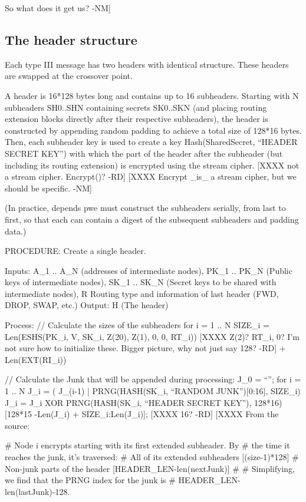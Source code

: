       So what does it get us?  -NM]  

\subsection{The header structure}

Each type III message has two headers with identical structure. These
headers are swapped at the crossover point.

A header is 16*128 bytes long and contains up to 16
subheaders. Starting with N subheaders SH0..SHN containing secrets
SK0..SKN (and placing routing extension blocks directly after their
respective subheaders), the header is constructed by appending 
random padding to achieve a total size
of 128*16 bytes. Then, each subheader key is used to create a key
Hash(SharedSecret, ``HEADER SECRET KEY'') with which the part of the
header after the subheader (but including its routing extension) is
encrypted using the stream cipher. 
[XXXX not a stream cipher. Encrypt()? -RD]
[XXXX Encrypt _is_ a stream cipher, but we should be specific. -NM]

(In practice, depends pwe must construct the subheaders serially, from last to
first, so that each can contain a digest of the subsequent subheaders
and padding data.) 

PROCEDURE: Create a single header.

Inputs: A_1 .. A_N (addresses of intermediate nodes), 
	PK_1 .. PK_N (Public keys of intermediate nodes),
	SK_1 .. SK_N (Secret keys to be shared with intermediate nodes),
        R Routing type and information of last header (FWD, DROP, SWAP, etc.)
Output: H (The header)

Process: 
  // Calculate the sizes of the subheaders
  for i = 1 .. N
	SIZE_i = Len(ESHS(PK_i, V, SK_i, Z(20), Z(1), 0, 0, RT_i))
[XXXX                                           Z(2)?    RT_i, 0?
  I'm not sure how to initialize these. Bigger picture, why not just
  say 128? -RD]
                    + Len(EXT(RI_i))

  // Calculate the Junk that will be appended during processing:
  J_0 = ``'';
  for i = 1 .. N
	J_i = ( J_(i-1) | PRNG(HASH(SK_i, ``RANDOM JUNK'')[0:16], SIZE_i)
	J_i = J_i XOR PRNG(HASH(SK_i, ``HEADER SECRET KEY''),
  		128*16)[128*15 -Len(J_i) + SIZE_i:Len(J_i)];
[XXXX                       16? -RD]
[XXXX  From the source:

        # Node i encrypts starting with its first extended subheader.  By
        #   the time it reaches the junk, it's traversed:
        #          All of its extended subheaders    [(size-1)*128]
        #          Non-junk parts of the header      [HEADER_LEN-len(nextJunk)]
        #
        # Simplifying, we find that the PRNG index for the junk is
        #    HEADER_LEN-len(lastJunk)-128.

